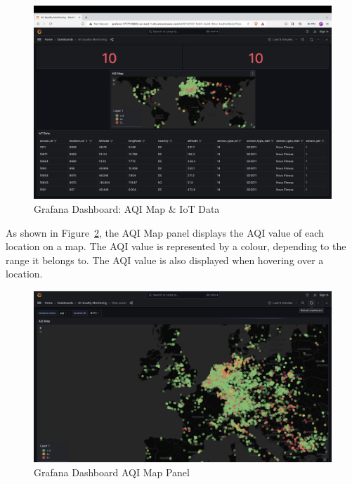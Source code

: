 \documentclass[12pt,oneside]{book} %
\begin{document}
\begin{figure}[H]
    \centering
    \includegraphics[width=1\linewidth]{images/grafana-2.png}
    \caption{Grafana Dashboard: AQI Map \& IoT Data}\label{fig:grafana-main-panel-2}
\end{figure}

\newpage
As shown in Figure~\ref{fig:grafana-aqi-map-panel}, the AQI Map panel displays
the AQI value of each location on a map. The AQI value is represented by a
colour, depending to the range it belongs to. The AQI value is also displayed
when hovering over a location.
\begin{figure}[H]
    \centering
    \includegraphics[width=1\linewidth]{images/grafana-4.png}
    \caption{Grafana Dashboard AQI Map Panel}\label{fig:grafana-aqi-map-panel}
\end{figure}
\end{document}

